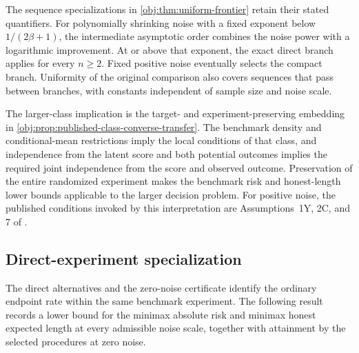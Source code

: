 The sequence specializations in \cref{obj:thm:uniform-frontier} retain their stated quantifiers. For polynomially shrinking noise with a fixed exponent below \(1/(2\beta+1)\), the intermediate asymptotic order combines the noise power with a logarithmic improvement. At or above that exponent, the exact direct branch applies for every \(n\ge2\). Fixed positive noise eventually selects the compact branch. Uniformity of the original comparison also covers sequences that pass between branches, with constants independent of sample size and noise scale.

The larger-class implication is the target- and experiment-preserving embedding in \cref{obj:prop:published-class-converse-transfer}. The benchmark density and conditional-mean restrictions imply the local conditions of that class, and independence from the latent score and both potential outcomes implies the required joint independence from the score and observed outcome. Preservation of the entire randomized experiment makes the benchmark risk and honest-length lower bounds applicable to the larger decision problem. For positive noise, the published conditions invoked by this interpretation are Assumptions~1Y, 2C, and 7 of \citet{PeiShen2017DevilTails}.

\subsection{Direct-experiment specialization}

The direct alternatives and the zero-noise certificate identify the ordinary endpoint rate within the same benchmark experiment. The following result records a lower bound for the minimax absolute risk  and minimax honest expected length  at every admissible noise scale, together with attainment by the selected procedures at zero noise.

